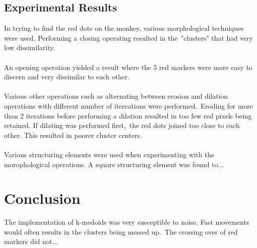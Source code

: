 \documentclass[12pt,a4paper]{article}
\begin{document}
      \subsection{Experimental Results}
      In trying to find the red dots on the monkey, various morphological techniques were used. Performing a closing operating resulted in the\
      "clusters" that had very low dissimilarity.
      \\\\
      An opening operation yielded a result where the 5 red markers were more easy to discern and very dissimilar to each other.
      \\\\
      Various other operations such as alternating between erosion and dilation operations with different number of itereations were performed.\
      Eroding for more than 2 iterations before performing a dilation resulted in too few red pixels being retained. If dilating was performed first,\
      the red dots joined too close to each other. This resulted in poorer cluster centers.
      \\\\
      Various structuring elements were used when experimenting with the morophological operations. A square structuring element was found to...

    \section{Conclusion}
    The implementation of k-medoids was very susceptible to noise. Fast movements would often results in the clusters being messed up.\
    The crossing over of red markers did not...
\end{document}
